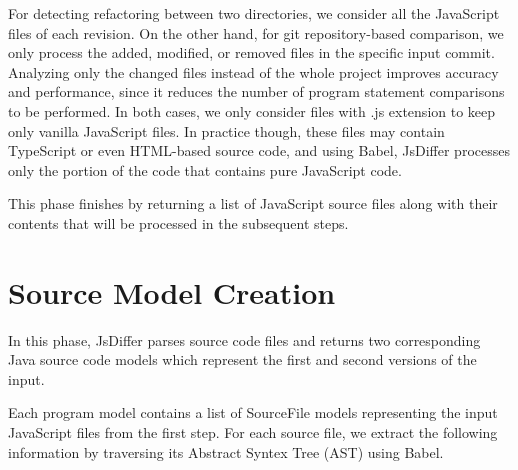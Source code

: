 \documentclass[letterpaper,12pt,onecolumn,final]{report}
\begin{document}
For detecting refactoring between two directories, we consider all the JavaScript files of each revision. On the other hand, for git repository-based comparison, we only process the added, modified, or removed files in the specific input commit. Analyzing only the changed files instead of the whole project improves accuracy and performance, since it reduces the number of program statement comparisons to be performed. In both cases, we only consider files with .js extension to keep only vanilla JavaScript files. In practice though, these files may contain TypeScript or even HTML-based source code, and using Babel, JsDiffer processes only the portion of the code that contains pure JavaScript code.

This phase finishes by returning a list of JavaScript source files along with their contents that will be processed in the subsequent steps.

\section {Source Model Creation}
In this phase, JsDiffer parses source code files and returns two corresponding Java source code models which represent the first and second versions of the input.

Each program model contains a list of SourceFile models representing the input JavaScript files from the first step. For each source file, we extract the following information by traversing its Abstract Syntex Tree (AST) using Babel.
\end{document}
